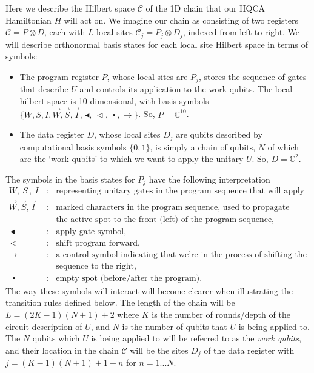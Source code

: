 \documentclass[11pt,letterpaper]{article}
\newcommand{\<}{\langle}
\renewcommand{\>}{\rangle}
\newcommand{\gat}{\,\blacktriangleleft}  %
\newcommand{\mov}{\,\vartriangleleft}    %
\newcommand{\bul}{\:\:\centerdot\:}       %
\newcommand{\iga}{\:I\,}                  %
\newcommand{\ri}{\overrightarrow{I}}
\newcommand{\wga}{W}						%
\newcommand{\rw}{\overrightarrow{W}}
\newcommand{\sga}{\:S\,}					%
\newcommand{\rs}{\overrightarrow{S}}
\begin{document}
Here we describe the Hilbert space $\mathcal{C}$ of the 1D chain that our HQCA Hamiltonian $H$ will act on. We imagine our chain as consisting of two registers $\mathcal{C}=P\otimes D$, each with $L$ local sites $\mathcal{C}_j=P_j\otimes D_j$, indexed from left to right. We will describe orthonormal basis states for each local site Hilbert space in terms of symbols:
\begin{itemize}
	\item The program register $P$, whose local sites are $P_j$, stores the sequence of gates that describe $U$ and controls its application to the work qubits. The local hilbert space is 10 dimensional, with basis symbols $\{W,S,I,\overrightarrow{W},\overrightarrow{S},\overrightarrow{I},\gat,\mov,\bul,\rightarrow\}$. So, $P=\mathbb{C}^{10}$.
	\item The data register $D$, whose local sites $D_j$ are qubits described by computational basis symbols $\{0,1\}$, is simply a chain of qubits, $N$ of which are the `work qubits' to which we want to apply the unitary $U$. So, $D=\mathbb{C}^2$. %
\end{itemize}
The symbols in the basis states for $P_j$ have the following interpretation
\begin{eqnarray}
	\wga,\sga,\iga &:& \textrm{representing unitary gates in the program sequence that will apply U,} 
		\nonumber\\
	\rw,\rs,\ri &:& \textrm{marked characters in the program sequence, used to propagate} \nonumber\\
			&& \textrm{the active spot to the front (left) of the program sequence,} \nonumber\\
	\gat &:& \textrm{apply gate symbol,} \nonumber\\
	\mov &:& \textrm{shift program forward,} \nonumber \\
	\rightarrow &:& \textrm{a control symbol indicating that we're in the process of shifting the program } \nonumber \\
	&&\textrm{sequence to the right}, \nonumber \\
	\bul &:& \textrm{empty spot (before/after the program)}. \nonumber
\end{eqnarray}
The way these symbols will interact will become clearer when illustrating the transition rules defined below. The length of the chain will be $L=(2K-1)(N+1)+2$ where $K$ is the number of rounds/depth of the circuit description of $U$, and $N$ is the number of qubits that $U$ is being applied to. The $N$ qubits which $U$ is being applied to will be referred to as the \emph{work qubits}, and their location in the chain $\mathcal{C}$ will be the sites $D_j$ of the data register with $j=(K-1)(N+1)+1+n$ for $n=1...N$.
\end{document}
